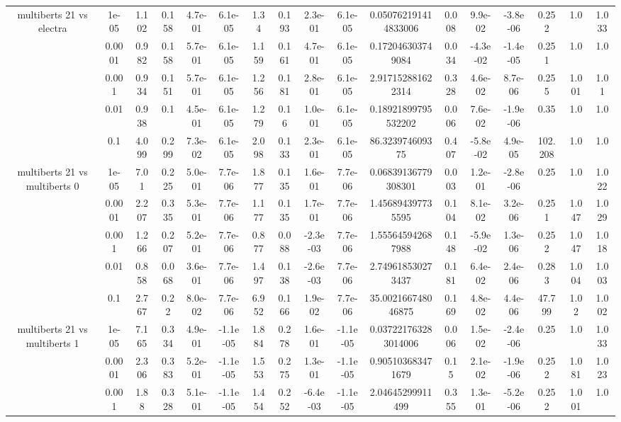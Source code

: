 \begin{tabular}{|c|c|c|c|c|c|c|c|c|c|c|c|c|c|c|c|c|}
\hline
\multirow{5}{*}{multiberts 21 vs electra } & 1e-05 & 1.102 & 0.158 & 4.7e-01 & 6.1e-05 & 1.34 & 0.193 & 2.3e-01 & 6.1e-05 & 0.050762191414833006 & 0.008 & 9.9e-02 & -3.8e-06 & 0.252 & 1.0 & 1.033 \\
 & 0.0001 & 0.982 & 0.158 & 5.7e-01 & 6.1e-05 & 1.159 & 0.161 & 4.7e-01 & 6.1e-05 & 0.172046303749084 & 0.034 & -4.3e-02 & -1.4e-05 & 0.251 & 1.0 & 1.0 \\
 & 0.001 & 0.934 & 0.151 & 5.7e-01 & 6.1e-05 & 1.256 & 0.181 & 2.8e-01 & 6.1e-05 & 2.917152881622314 & 0.328 & 4.6e-02 & 8.7e-06 & 0.255 & 1.001 & 1.01 \\
 & 0.01 & 0.938 & 0.1 & 4.5e-01 & 6.1e-05 & 1.279 & 0.16 & 1.0e-01 & 6.1e-05 & 0.18921899795532202 & 0.006 & 7.6e-02 & -1.9e-06 & 0.35 & 1.0 & 1.0 \\
 & 0.1 & 4.099 & 0.299 & 7.3e-02 & 6.1e-05 & 2.098 & 0.133 & 2.3e-01 & 6.1e-05 & 86.323974609375 & 0.407 & -5.8e-02 & 4.9e-05 & 102.208 & 1.0 & 1.0 \\
\hline
\multirow{5}{*}{multiberts 21 vs multiberts 0} & 1e-05 & 7.01 & 0.225 & 5.0e-01 & 7.7e-06 & 1.877 & 0.135 & 1.6e-01 & 7.7e-06 & 0.06839136779308301 & 0.003 & 1.2e-01 & -2.8e-06 & 0.25 & 1.0 & 1.022 \\
 & 0.0001 & 2.207 & 0.335 & 5.3e-01 & 7.7e-06 & 1.177 & 0.135 & 1.7e-01 & 7.7e-06 & 1.456894397735595 & 0.104 & 8.1e-02 & 3.2e-06 & 0.251 & 1.047 & 1.029 \\
 & 0.001 & 1.266 & 0.207 & 5.2e-01 & 7.7e-06 & 0.877 & 0.088 & -2.3e-03 & 7.7e-06 & 1.555645942687988 & 0.148 & -5.9e-02 & 1.3e-06 & 0.252 & 1.047 & 1.018 \\
 & 0.01 & 0.858 & 0.068 & 3.6e-01 & 7.7e-06 & 1.497 & 0.138 & -2.6e-03 & 7.7e-06 & 2.749618530273437 & 0.181 & 6.4e-02 & 2.4e-06 & 0.283 & 1.004 & 1.003 \\
 & 0.1 & 2.767 & 0.22 & 8.0e-02 & 7.7e-06 & 6.952 & 0.166 & 1.9e-02 & 7.7e-06 & 35.002166748046875 & 0.169 & 4.8e-02 & 4.4e-06 & 47.799 & 1.02 & 1.002 \\
\hline
\multirow{5}{*}{multiberts 21 vs multiberts 1} & 1e-05 & 7.165 & 0.334 & 4.9e-01 & -1.1e-05 & 1.884 & 0.278 & 1.6e-01 & -1.1e-05 & 0.037221763283014006 & 0.006 & 1.5e-02 & -2.4e-06 & 0.25 & 1.0 & 1.033 \\
 & 0.0001 & 2.306 & 0.383 & 5.2e-01 & -1.1e-05 & 1.553 & 0.275 & 1.3e-01 & -1.1e-05 & 0.905103683471679 & 0.15 & 2.1e-02 & -1.9e-06 & 0.252 & 1.081 & 1.023 \\
 & 0.001 & 1.88 & 0.328 & 5.1e-01 & -1.1e-05 & 1.454 & 0.252 & -6.4e-03 & -1.1e-05 & 2.04645299911499 & 0.355 & 1.3e-01 & -5.2e-06 & 0.252 & 1.001 & 1.0 \\

\end{tabular}
